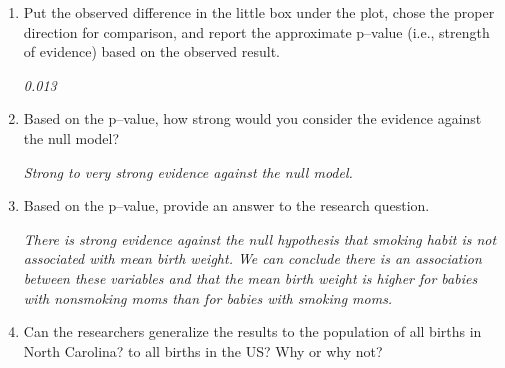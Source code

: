 \begin{enumerate}
\begin{students}
 \vspace{1cm}  
\end{students}

\begin{key}
  {\it  The mean birth weight for babies whose mother smoked is lower
  than the mean birth weight for babies whose mothers did not
  smoke. Use less than -0.778}
\end{key}

 
\item   Put the observed difference in the little box under the plot,
  chose the proper direction for comparison, and report the
  approximate p--value (i.e., strength of evidence) 
  based on the observed result. 
\begin{students}
 \vspace{1cm}
\end{students}

\begin{key}
  {\it  0.013}
\end{key}

\item  Based on the p--value, how strong would you consider the
  evidence against the null model?  
\begin{students}
 \vspace{1cm}
\end{students}

\begin{key}
  {\it  Strong  to very strong evidence against the null model.}
\end{key}

   
\item  Based on the p--value, provide an answer to the research
  question.  
\begin{students}
 \vspace{1cm}
\end{students}

\begin{key}
  {\it There is strong evidence against the null hypothesis
  that smoking habit is not associated with mean birth weight.  We can
  conclude there is an association 
  between these variables and that the mean birth weight
   is higher for babies with nonsmoking moms than for babies with
   smoking moms.}
\end{key}

  

\item  Can the researchers generalize the results to the population of
  all births in North Carolina?  to all births in the US? Why or why not?
\begin{students}
 \vspace{1cm} 
\end{students}


\end{enumerate}
